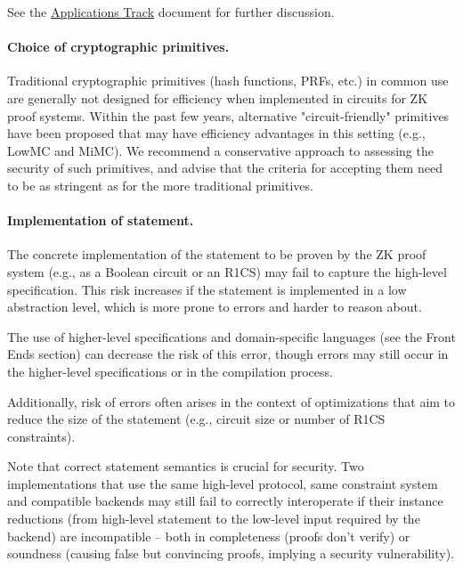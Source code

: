 See the \hyperref[chap:apps]{Applications Track} document for further discussion.


\paragraph{Choice of cryptographic primitives.}

Traditional cryptographic primitives (hash functions, PRFs, etc.) in common use are generally not designed for efficiency when implemented in circuits for ZK proof systems. Within the past few years, alternative "circuit-friendly" primitives have been proposed that may have efficiency advantages in this setting (e.g., LowMC and MiMC). We recommend a conservative approach to assessing the security of such primitives, and advise that the criteria for accepting them need to be as stringent as for the more traditional primitives.


\paragraph{Implementation of statement.}

The concrete implementation of the statement to be proven by the ZK proof system (e.g., as a Boolean circuit or an R1CS) may fail to capture the high-level specification. This risk increases if the statement is implemented in a low abstraction level, which is more prone to errors and harder to reason about.

The use of higher-level specifications and domain-specific languages (see the Front Ends section) can decrease the risk of this error, though errors may still occur in the higher-level specifications or in the compilation process.

Additionally, risk of errors often arises in the context of optimizations that aim to reduce the size of the statement (e.g., circuit size or number of R1CS constraints).

Note that correct statement semantics is crucial for security. Two implementations that use the same high-level protocol, same constraint system and compatible backends may still fail to correctly interoperate if their instance reductions (from high-level statement to the low-level input required by the backend) are incompatible -- both in completeness (proofs don’t verify) or soundness (causing false but convincing proofs, implying a security vulnerability).


